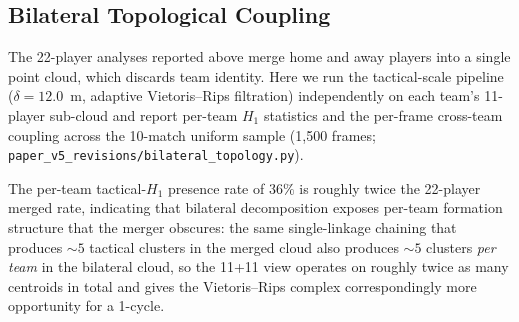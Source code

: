 \subsection{Bilateral Topological Coupling}
\label{sec:bilateral}

The 22-player analyses reported above merge home and away players into a single point cloud, which discards team identity. Here we run the tactical-scale pipeline (\(\delta=12.0\)~m, adaptive Vietoris--Rips filtration) independently on each team's 11-player sub-cloud and report per-team \(H_1\) statistics and the per-frame cross-team coupling across the 10-match uniform sample (1{,}500 frames; \texttt{paper\_v5\_revisions/bilateral\_topology.py}).

\begin{table}[H]
  \centering
  \caption{Per-team tactical-scale \(H_1\) statistics, single-linkage at \(\delta=12.0\)~m on each team's 11-player sub-cloud (10 SkillCorner matches, 1{,}500 frames). Per-team rates are nearly identical between home and away (sanity check) and substantially exceed the 22-player merged tactical \(H_1\) rate of \(19.3\%\pm7.2\%\) reported in Table~\ref{tab:h1multi}.}
  \label{tab:bilateral_perteam}
\end{table}

The per-team tactical-\(H_1\) presence rate of \(36\%\) is roughly twice the 22-player merged rate, indicating that bilateral decomposition exposes per-team formation structure that the merger obscures: the same single-linkage chaining that produces \(\sim 5\) tactical clusters in the merged cloud also produces \(\sim 5\) clusters \emph{per team} in the bilateral cloud, so the 11+11 view operates on roughly twice as many centroids in total and gives the Vietoris--Rips complex correspondingly more opportunity for a 1-cycle.

